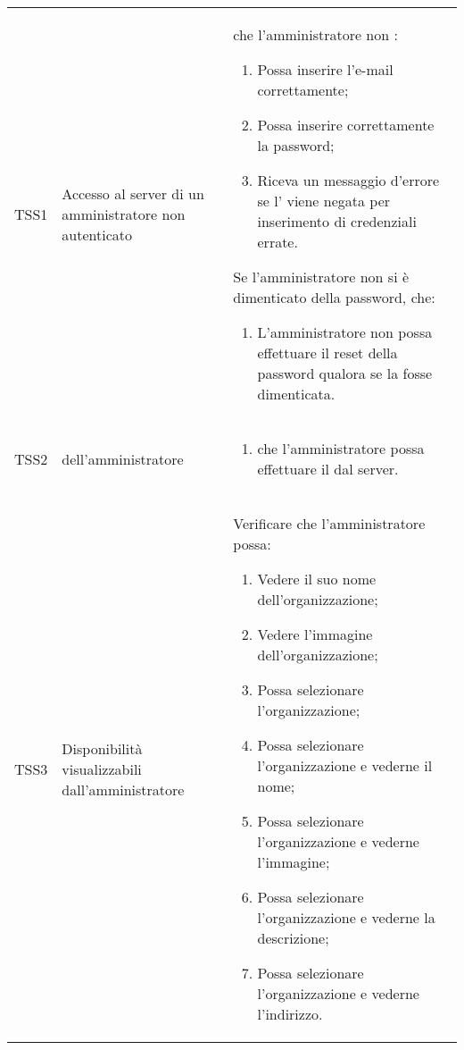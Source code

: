 {\begin{longtable}{ c  C{3cm}  C{11cm} }
TSS1 & Accesso al server di un amministratore non autenticato & 
 che l'amministratore non :
\begin{enumerate}
    \item Possa inserire l'e-mail correttamente;
    \item Possa inserire correttamente la password;
    \item Riceva un messaggio d'errore se l' viene negata per inserimento di credenziali errate.
\end{enumerate}
Se l'amministratore non  si è dimenticato della password,  che:
\begin{enumerate}[resume]
    \item L'amministratore non  possa effettuare il reset della password qualora se la fosse dimenticata.
\end{enumerate} \\

TSS2 &  dell'amministratore  & \begin{enumerate}
    \item {} che l'amministratore  possa effettuare il  dal server.
\end{enumerate} \\

TSS3 & Disponibilità  visualizzabili dall'amministratore &
Verificare che l'amministratore possa:
\begin{enumerate}
    \item Vedere il suo nome dell'organizzazione;
    \item Vedere l'immagine dell'organizzazione;
    \item Possa selezionare l'organizzazione;
    \item Possa selezionare l'organizzazione e vederne il nome;
    \item Possa selezionare l'organizzazione e vederne l'immagine;
    \item Possa selezionare l'organizzazione e vederne la descrizione;
    \item Possa selezionare l'organizzazione e vederne l'indirizzo.
\end{enumerate} \\


\end{longtable}}

